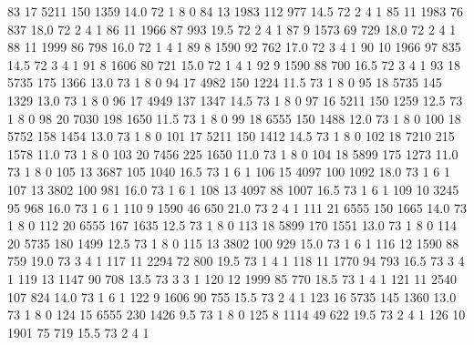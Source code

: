 \documentclass{article}
\begin{document}
\begin{Schunk}
\begin{Soutput}
83       17  5211 150 1359 14.0  72      1       8        0
84       13  1983 112  977 14.5  72      2       4        1
85       11  1983  76  837 18.0  72      2       4        1
86       11  1966  87  993 19.5  72      2       4        1
87        9  1573  69  729 18.0  72      2       4        1
88       11  1999  86  798 16.0  72      1       4        1
89        8  1590  92  762 17.0  72      3       4        1
90       10  1966  97  835 14.5  72      3       4        1
91        8  1606  80  721 15.0  72      1       4        1
92        9  1590  88  700 16.5  72      3       4        1
93       18  5735 175 1366 13.0  73      1       8        0
94       17  4982 150 1224 11.5  73      1       8        0
95       18  5735 145 1329 13.0  73      1       8        0
96       17  4949 137 1347 14.5  73      1       8        0
97       16  5211 150 1259 12.5  73      1       8        0
98       20  7030 198 1650 11.5  73      1       8        0
99       18  6555 150 1488 12.0  73      1       8        0
100      18  5752 158 1454 13.0  73      1       8        0
101      17  5211 150 1412 14.5  73      1       8        0
102      18  7210 215 1578 11.0  73      1       8        0
103      20  7456 225 1650 11.0  73      1       8        0
104      18  5899 175 1273 11.0  73      1       8        0
105      13  3687 105 1040 16.5  73      1       6        1
106      15  4097 100 1092 18.0  73      1       6        1
107      13  3802 100  981 16.0  73      1       6        1
108      13  4097  88 1007 16.5  73      1       6        1
109      10  3245  95  968 16.0  73      1       6        1
110       9  1590  46  650 21.0  73      2       4        1
111      21  6555 150 1665 14.0  73      1       8        0
112      20  6555 167 1635 12.5  73      1       8        0
113      18  5899 170 1551 13.0  73      1       8        0
114      20  5735 180 1499 12.5  73      1       8        0
115      13  3802 100  929 15.0  73      1       6        1
116      12  1590  88  759 19.0  73      3       4        1
117      11  2294  72  800 19.5  73      1       4        1
118      11  1770  94  793 16.5  73      3       4        1
119      13  1147  90  708 13.5  73      3       3        1
120      12  1999  85  770 18.5  73      1       4        1
121      11  2540 107  824 14.0  73      1       6        1
122       9  1606  90  755 15.5  73      2       4        1
123      16  5735 145 1360 13.0  73      1       8        0
124      15  6555 230 1426  9.5  73      1       8        0
125       8  1114  49  622 19.5  73      2       4        1
126      10  1901  75  719 15.5  73      2       4        1

\end{Soutput}
\end{Schunk}
\end{document}
